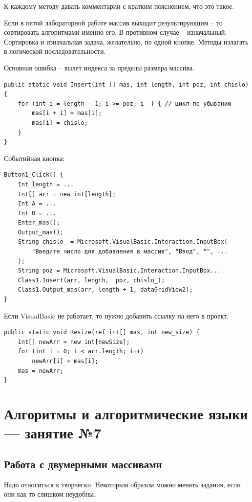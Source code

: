 \documentclass{article}
\begin{document}
К каждому методу давать комментарии с кратким пояснением, что это такое.

\hfill

Если в пятой лабораторной работе массив выходит результирующим – то сортировать алгоритмами именно его. В противном случае – изначальный. Сортировка и изначальная задача, желательно, по одной кнопке. Методы излагать в логической последовательности.

Основная ошибка – вылет индекса за пределы размера массива.

\hfill

\begin{verbatim}
public static void Insert(int [] mas, int length, int poz, int chislo) {
    for (int i = length – 1; i >= poz; i--) { // цикл по убыванию
        mas[i + 1] = mas[i];
        mas[i] = chislo;
    }
}
\end{verbatim}

Событийная кнопка:

\begin{verbatim}
Button1_Click() {
    Int length = ...
    Int[] arr = new int[length];
    Int A = ...
    Int B = ...
    Enter_mas();
    Output_mas();
    String chislo_ = Microsoft.VisualBasic.Interaction.InputBox(
        "Введите число для добавления в массив", "Ввод", "", ...
    );
    String poz = Microsoft.VisualBasic.Interaction.InputBox...
    Class1.Insert(arr, length,  poz, chislo_);
    Class1.Output_mas(arr, length + 1, dataGridView2);
}
\end{verbatim}

Если VisualBasic не работает, то нужно добавить ссылку на него в проект.

\begin{verbatim}
public static void Resize(ref int[] mas, int new_size) {
    Int[] newArr = new int[newSize];
    for (int i = 0; i < arr.length; i++) 
        newArr[i] = mas[i];
    mas = newArr;
}
\end{verbatim}

\pagebreak
\section{Алгоритмы и алгоритмические языки — занятие №7}

\subsection{Работа с двумерными массивами}

Надо относиться к творчески. Некоторым образом можно менять задания, если они как-то слишком неудобны.
\end{document}
